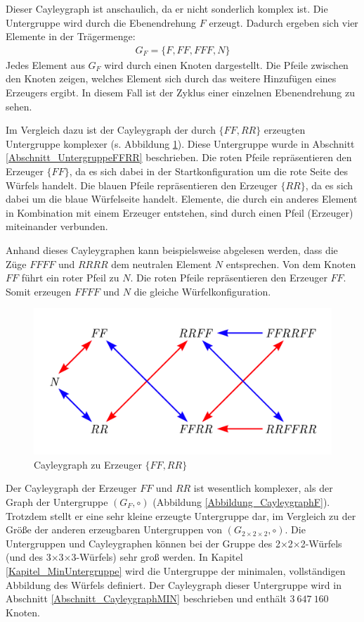 \documentclass[12pt,a4paper, usenames, dvipsnames]{article}
\theoremstyle{mystyle}
\theoremstyle{definition}
\newcommand{\Gtwo}{\ensuremath{G_{2\times 2\times 2}}}
\newcommand{\Ttwo}{2$\times$2$\times$2-}
\newcommand{\Tthree}{3$\times$3$\times$3-}
\begin{document}
Dieser Cayleygraph ist anschaulich, da er nicht sonderlich komplex ist.
Die Untergruppe wird durch die Ebenendrehung $F$ erzeugt. Dadurch ergeben sich vier Elemente in der Trägermenge:
\begin{align*}
G_F = \{F, FF, FFF, N\}
\end{align*}
Jedes Element aus $G_F$ wird durch einen Knoten dargestellt. Die Pfeile zwischen den Knoten zeigen, welches Element sich durch das weitere Hinzufügen eines Erzeugers ergibt. In diesem Fall ist der Zyklus einer einzelnen Ebenendrehung zu sehen.


Im Vergleich dazu ist der Cayleygraph der durch $\{ FF, RR \}$ erzeugten Untergruppe komplexer (s. Abbildung \ref{Abbildung_CayleygraphFFRR}). Diese Untergruppe wurde in Abschnitt \ref{Abschnitt_UntergruppeFFRR} beschrieben.
Die roten Pfeile repräsentieren den Erzeuger $\{FF\}$, da es sich dabei in der Startkonfiguration um die rote Seite des Würfels handelt. Die blauen Pfeile repräsentieren den Erzeuger $\{RR\}$, da es sich dabei um die blaue Würfelseite handelt.
Elemente, die durch ein anderes Element in Kombination mit einem Erzeuger entstehen, sind durch einen Pfeil (Erzeuger) miteinander verbunden.

Anhand dieses Cayleygraphen kann beispielsweise abgelesen werden, dass die Züge $FFFF$ und $RRRR$ dem neutralen Element $N$ entsprechen. Von dem Knoten $FF$ führt ein roter Pfeil zu $N$. Die roten Pfeile repräsentieren den Erzeuger $FF$. Somit erzeugen $FFFF$ und $N$ die gleiche Würfelkonfiguration.

\begin{figure}[H]
\centering
\includegraphics[scale=0.65]{Cayleygraph2.png}
\caption{Cayleygraph zu Erzeuger $\{ FF, RR \}$}
\label{Abbildung_CayleygraphFFRR}
\end{figure}

Der Cayleygraph der Erzeuger $FF$ und $RR$ ist wesentlich komplexer, als der Graph der Untergruppe $(G_F, \circ)$ (Abbildung \ref{Abbildung_CayleygraphF}). Trotzdem stellt er eine sehr kleine erzeugte Untergruppe dar, im Vergleich zu der Größe der anderen erzeugbaren Untergruppen von $(\Gtwo, \circ)$. Die Untergruppen und Cayleygraphen können bei der Gruppe des \Ttwo Würfels (und des \Tthree Würfels) sehr groß werden. In Kapitel \ref{Kapitel_MinUntergruppe} wird die Untergruppe der minimalen, vollständigen Abbildung des Würfels definiert. Der Cayleygraph dieser Untergruppe wird in Abschnitt \ref{Abschnitt_CayleygraphMIN} beschrieben und enthält $3 \ 647 \ 160$ Knoten.
\end{document}
